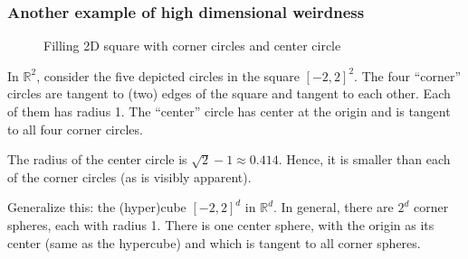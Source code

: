 \documentclass[smaller]{beamer}
\theoremstyle{example}
\newcommand{\x}{\textbf{x}}
\begin{document}
\begin{frame}
    \frametitle{Another example of high dimensional weirdness}
    \begin{minipage}{\textwidth}
    \begin{figure}
        \begin{center}
        \end{center}
        \caption{Filling 2D square with corner circles and center circle}
    \end{figure}

    In $\mathbb R^2$, consider the five depicted circles in the square $[-2,2]^2$. The four ``corner'' circles are tangent to (two) edges of the square and tangent to each other. Each of them has radius 1. The ``center'' circle has center at the origin and is tangent to all four corner circles.

    \pause
    The radius of the center circle is $\sqrt{2} - 1\approx 0.414$. Hence, it is smaller than each of the corner circles (as is visibly apparent).

    \pause
    Generalize this: the (hyper)cube $[-2,2]^d$ in $\mathbb R^d$. In general, there are $2^d$ corner spheres, each with radius 1. There is one center sphere, with the origin as its center (same as the hypercube) and which is tangent to all corner spheres.
    \end{minipage}
\end{frame}
\end{document}
